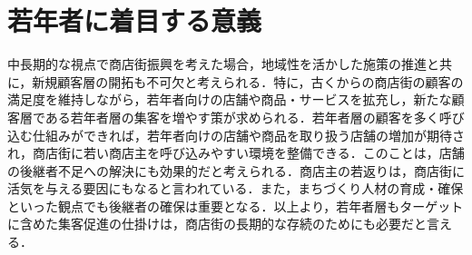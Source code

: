 \section{若年者に着目する意義}

中長期的な視点で商店街振興を考えた場合，地域性を活かした施策の推進と共に，新規顧客層の開拓も不可欠と考えられる．特に，古くからの商店街の顧客の満足度を維持しながら，若年者向けの店舗や商品・サービスを拡充し，新たな顧客層である若年者層の集客を増やす策が求められる．若年者層の顧客を多く呼び込む仕組みができれば，若年者向けの店舗や商品を取り扱う店舗の増加が期待され，商店街に若い商店主を呼び込みやすい環境を整備できる．このことは，店舗の後継者不足への解決にも効果的だと考えられる．商店主の若返りは，商店街に活気を与える要因にもなると言われている．また，まちづくり人材の育成・確保といった観点でも後継者の確保は重要となる．以上より，若年者層もターゲットに含めた集客促進の仕掛けは，商店街の長期的な存続のためにも必要だと言える．